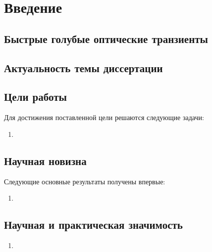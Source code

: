 \chapter*{Введение}					

\section*{Быстрые голубые оптические транзиенты}



\section*{Актуальность темы диссертации}


\section*{Цели работы}

Для достижения поставленной цели решаются следующие задачи:
\begin{enumerate}
\item 
\end{enumerate}

\section*{Научная новизна}

Следующие основные результаты получены впервые:
\begin{enumerate}
\item 
\end{enumerate}

\section*{Научная и практическая значимость}

\begin{enumerate}
\item 
\end{enumerate}

